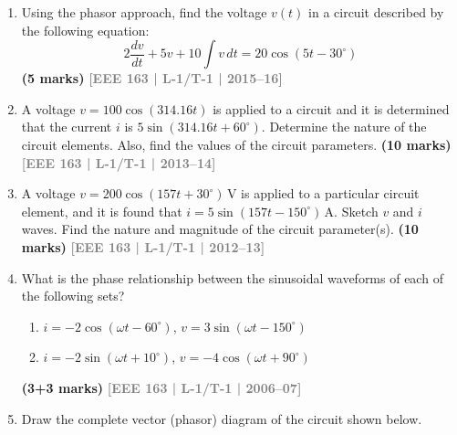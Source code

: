 \documentclass[12pt,a3paper]{article}
\newcommand{\yr}[1]{\hfill\textcolor{gray}{\small\textbf{[#1]}}}
\newcommand{\mk}[1]{\textcolor{orange!70!black}{\small\textbf{(#1 marks)}}}
\begin{document}
\begin{enumerate}\item Using the phasor approach, find the voltage $v(t)$ in a circuit described by the following equation:
\[2\frac{dv}{dt} + 5v + 10\int v\,dt = 20\cos(5t - 30^\circ)\]
\mk{5} \yr{EEE 163 | L-1/T-1 | 2015--16}

\item A voltage $v = 100\cos(314.16t)$ is applied to a circuit and it is determined that the current $i$ is $5\sin(314.16t + 60^\circ)$. Determine the nature of the circuit elements. Also, find the values of the circuit parameters.
\mk{10} \yr{EEE 163 | L-1/T-1 | 2013--14}

\item A voltage $v = 200\cos(157t + 30^\circ)$\,V is applied to a particular circuit element, and it is found that $i = 5\sin(157t - 150^\circ)$\,A. Sketch $v$ and $i$ waves. Find the nature and magnitude of the circuit parameter(s).
\mk{10} \yr{EEE 163 | L-1/T-1 | 2012--13}

\item What is the phase relationship between the sinusoidal waveforms of each of the following sets?
\begin{enumerate}
  \item $i = -2\cos(\omega t - 60^\circ)$, $v = 3\sin(\omega t - 150^\circ)$
  \item $i = -2\sin(\omega t + 10^\circ)$, $v = -4\cos(\omega t + 90^\circ)$
\end{enumerate}
\mk{3+3} \yr{EEE 163 | L-1/T-1 | 2006--07}

\item Draw the complete vector (phasor) diagram of the circuit shown below.
\begin{center}
\end{center}
\end{enumerate}
\end{document}
